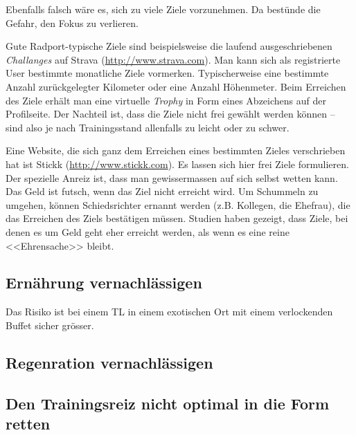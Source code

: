 \documentclass[a4paper,DIV13,BCOR0cm]{scrartcl}
\begin{document}
Ebenfalls falsch wäre es, sich zu viele Ziele vorzunehmen.
Da bestünde die Gefahr, den Fokus zu verlieren.

Gute Radport-typische Ziele sind beispielsweise die laufend ausgeschriebenen \textsl{Challanges} auf Strava (\url{http://www.strava.com}).
Man kann sich als registrierte User bestimmte monatliche Ziele vormerken.
Typischerweise eine bestimmte Anzahl zurückgelegter Kilometer oder eine Anzahl Höhenmeter.
Beim Erreichen des Ziele erhält man eine virtuelle \textsl{Trophy} in Form eines Abzeichens auf der Profilseite.
Der Nachteil ist, dass die Ziele nicht frei gewählt werden können -- sind also je nach Trainingsstand allenfalls zu leicht oder zu schwer.

Eine Website, die sich ganz dem Erreichen eines bestimmten Zieles verschrieben hat ist Stickk (\url{http://www.stickk.com}).
Es lassen sich hier frei Ziele formulieren.
Der spezielle Anreiz ist, dass man gewissermassen auf sich selbst wetten kann.
Das Geld ist futsch, wenn das Ziel nicht erreicht wird.
Um Schummeln zu umgehen, können Schiedsrichter ernannt werden (z.B. Kollegen, die Ehefrau), die das Erreichen des Ziels bestätigen müssen.
Studien haben gezeigt, dass Ziele, bei denen es um Geld geht eher erreicht werden, als wenn es eine reine <<Ehrensache>> bleibt.

\subsection{Ernährung vernachlässigen}

Das Risiko ist bei einem TL in einem exotischen Ort mit einem verlockenden Buffet sicher grösser.

\subsection{Regenration vernachlässigen}

\subsection{Den Trainingsreiz nicht optimal in die Form retten}



% 

\end{document}
